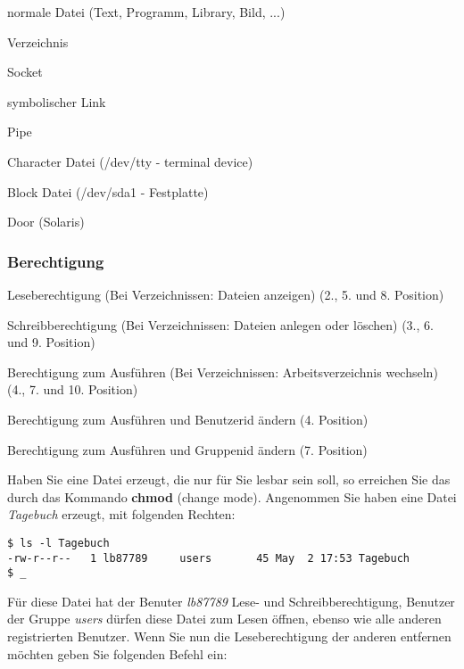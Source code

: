 \documentclass[titlepage,a4paper]{article}
\begin{document}
\begin{description}
\setlength{\itemsep}{0pt}
\item[-] normale Datei (Text, Programm, Library, Bild, ...)
\item[d] Verzeichnis
\item[s] Socket
\item[l] symbolischer Link
\item[p] Pipe
\item[c] Character Datei (/dev/tty - terminal device)
\item[b] Block Datei (/dev/sda1 - Festplatte)
\item[D] Door (Solaris)
\end{description}

\subsubsection*{Berechtigung}

\begin{description}
\setlength{\itemsep}{0pt}
\item[r] Leseberechtigung (Bei Verzeichnissen: Dateien anzeigen) (2., 5. und
  8. Position) 
\item[w] Schreibberechtigung (Bei Verzeichnissen: Dateien anlegen oder
  löschen) (3., 6. und 9. Position)
\item[x] Berechtigung zum Ausführen (Bei Verzeichnissen: Arbeitsverzeichnis
  wechseln) (4., 7. und 10. Position)
\item[s] Berechtigung zum Ausführen und Benutzerid ändern (4. Position)
\item[s] Berechtigung zum Ausführen und Gruppenid ändern (7. Position)
\end{description}

Haben Sie eine Datei erzeugt, die nur für Sie lesbar sein soll, so erreichen
Sie das durch das Kommando \textbf{chmod} (change mode).  Angenommen Sie haben
eine Datei \emph{Tagebuch} erzeugt, mit folgenden Rechten:

\begin{verbatim}
$ ls -l Tagebuch
-rw-r--r--   1 lb87789     users       45 May  2 17:53 Tagebuch
$ _
\end{verbatim}

Für diese Datei hat der Benuter \emph{lb87789} Lese- und Schreibberechtigung,
Benutzer der Gruppe \emph{users} dürfen diese Datei zum Lesen öffnen, ebenso
wie alle anderen registrierten Benutzer.  Wenn Sie nun die Leseberechtigung
der anderen entfernen möchten geben Sie folgenden Befehl ein:
\end{document}
